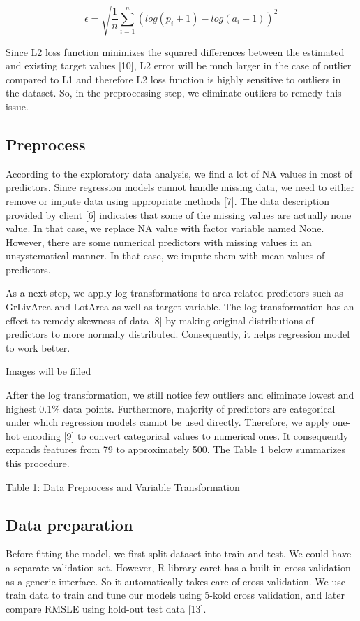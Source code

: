\documentclass[letterpaper, 10 pt, conference]{ieeeconf}  %
\begin{document}
$$
\epsilon = \sqrt{\frac{1}{n} \sum_{i=1}^{n} (log(p_{i} + 1) - log(a_{i} + 1))^2}
$$

Since L2 loss function minimizes the squared differences between the estimated and existing target values [10], L2 error will be much larger in the case of outlier compared to L1 and therefore L2 loss function is highly sensitive to outliers in the dataset. So, in the preprocessing step, we eliminate outliers to remedy this issue.

\subsection{Preprocess}
According to the exploratory data analysis, we find a lot of NA values in most of predictors. Since regression models cannot handle missing data, we need to either remove or impute data using appropriate methods [7]. The data description provided by client [6] indicates that some of the missing values are actually none value. In that case, we replace NA value with factor variable named None. However, there are some numerical predictors with missing values in an unsystematical manner. In that case, we impute them with mean values of predictors.

As a next step, we apply log transformations to area related predictors such as GrLivArea and LotArea as well as target variable. The log transformation has an effect to remedy skewness of data [8] by making original distributions of predictors to more normally distributed. Consequently, it helps regression model to work better.

Images will be filled

After the log transformation, we still notice few outliers and eliminate lowest and highest 0.1\% data points. Furthermore, majority of predictors are categorical under which regression models cannot be used directly. Therefore, we apply one-hot encoding [9] to convert categorical values to numerical ones. It consequently expands features from 79 to approximately 500. The Table 1 below summarizes this procedure.

Table 1: Data Preprocess and Variable Transformation

\subsection{Data preparation}
Before fitting the model, we first split dataset into train and test. We could have a separate validation set. However,  R library caret has a built-in cross validation as a generic interface. So it automatically takes care of cross validation. We use train data to train and tune our models using 5-kold cross validation, and later compare RMSLE using hold-out test data [13].
\end{document}

